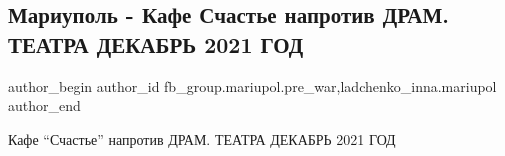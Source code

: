  
 
 
 
 

\subsection{Мариуполь - Кафе Счастье напротив ДРАМ. ТЕАТРА ДЕКАБРЬ 2021 ГОД}
\label{sec:28_01_2023.fb.fb_group.mariupol.pre_war.2.mariupol___kafe_scha}
 
\ifcmt
 author_begin
   author_id fb_group.mariupol.pre_war,ladchenko_inna.mariupol
 author_end
\fi

Кафе \enquote{Счастье} напротив ДРАМ. ТЕАТРА ДЕКАБРЬ 2021 ГОД

